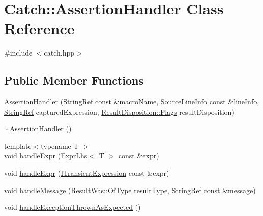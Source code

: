 \hypertarget{class_catch_1_1_assertion_handler}{}\section{Catch\+::Assertion\+Handler Class Reference}
\label{class_catch_1_1_assertion_handler}


{\ttfamily \#include $<$catch.\+hpp$>$}

\subsection*{Public Member Functions}
\begin{DoxyCompactItemize}
\item 
\mbox{\hyperlink{class_catch_1_1_assertion_handler_a32efbb1b56b71d758d4c2094bac1f1a9}{Assertion\+Handler}} (\mbox{\hyperlink{class_catch_1_1_string_ref}{String\+Ref}} const \&macro\+Name, \mbox{\hyperlink{struct_catch_1_1_source_line_info}{Source\+Line\+Info}} const \&line\+Info, \mbox{\hyperlink{class_catch_1_1_string_ref}{String\+Ref}} captured\+Expression, \mbox{\hyperlink{struct_catch_1_1_result_disposition_a3396cad6e2259af326b3aae93e23e9d8}{Result\+Disposition\+::\+Flags}} result\+Disposition)
\item 
\mbox{\hyperlink{class_catch_1_1_assertion_handler_a1e839d810f6ac0fa6d127fe8350175ed}{$\sim$\+Assertion\+Handler}} ()
\item 
{\footnotesize template$<$typename T $>$ }\\void \mbox{\hyperlink{class_catch_1_1_assertion_handler_a2ef387e567bad90ec6e4b5bf5c367388}{handle\+Expr}} (\mbox{\hyperlink{class_catch_1_1_expr_lhs}{Expr\+Lhs}}$<$ T $>$ const \&expr)
\item 
void \mbox{\hyperlink{class_catch_1_1_assertion_handler_afe14d9cf1b1c7f70dae439fbdb51d0c4}{handle\+Expr}} (\mbox{\hyperlink{struct_catch_1_1_i_transient_expression}{I\+Transient\+Expression}} const \&expr)
\item 
void \mbox{\hyperlink{class_catch_1_1_assertion_handler_abdb4c180ed83ec2858b2fb87712c516d}{handle\+Message}} (\mbox{\hyperlink{struct_catch_1_1_result_was_a624e1ee3661fcf6094ceef1f654601ef}{Result\+Was\+::\+Of\+Type}} result\+Type, \mbox{\hyperlink{class_catch_1_1_string_ref}{String\+Ref}} const \&message)
\item 
void \mbox{\hyperlink{class_catch_1_1_assertion_handler_ab6caf765764a4064e90fce829eec201d}{handle\+Exception\+Thrown\+As\+Expected}} ()
\item 

\end{DoxyCompactItemize}
